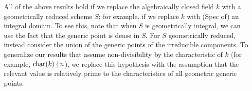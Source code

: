 \documentclass{amsart}
\begin{document}
\begin{remark}\label{rmk:replace-with-scheme}
  All of the above results %
hold
if we replace the algebraically closed field $k$ with a geometrically reduced scheme $S$; for example, if we replace $k$ with (Spec of) an integral domain. To see this, note that when $S$ is geometrically integral, we can use the fact that the generic point is dense in $S$. For $S$ geometrically reduced, instead consider the union of the generic points of the irreducible components. To generalize our results that assume non-divisibility by the characteristic of $k$ (for example, $\operatorname{char}(k) \nmid n$), we replace this hypothesis with the assumption that the relevant value %
is relatively prime to the characteristics of all geometric generic points. %
\end{remark}














%
\end{document}
